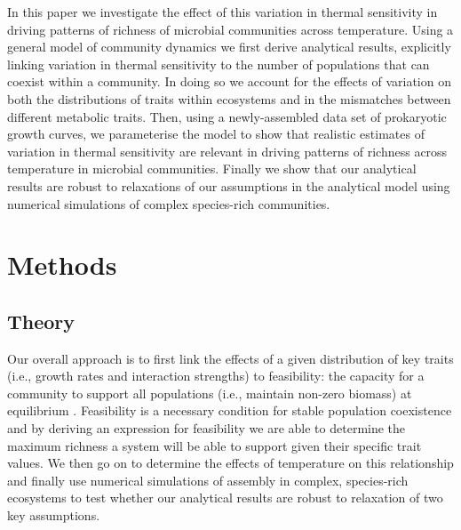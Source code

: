 \documentclass{article}
\begin{document}
In this paper we investigate the effect of this variation in thermal sensitivity in driving patterns of richness of microbial communities across temperature. Using a general model of community dynamics we first derive analytical results, explicitly linking variation in thermal sensitivity to the number of populations that can coexist within a community. In doing so we account for the effects of variation on both the distributions of traits within ecosystems and in the mismatches between different metabolic traits. Then, using a newly-assembled data set of prokaryotic growth curves, we parameterise the model to show that realistic estimates of variation in thermal sensitivity are relevant in driving patterns of richness across temperature in microbial communities. Finally we show that our analytical results are robust to relaxations of our assumptions in the analytical model using numerical simulations of complex species-rich communities. 

\section*{Methods}

\subsection*{Theory}

Our overall approach is to first link the effects of a given distribution of key traits (i.e., growth rates and interaction strengths) to feasibility: the capacity for a community to support all populations (i.e., maintain non-zero biomass) at equilibrium  \citep{Grilli2017,Dougoud2018}. Feasibility is a necessary condition for stable population coexistence and by deriving an expression for feasibility we are able to determine the maximum richness a system will be able to support given their specific trait values. We then go on to determine the effects of temperature on this relationship and finally use numerical simulations of assembly in complex, species-rich ecosystems to test whether our analytical results are robust to relaxation of two key assumptions.
\end{document}
